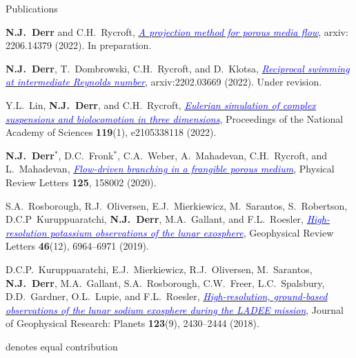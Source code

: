 \documentclass{cv}
\begin{document}
\begin{rSection}{Publications}

	\textbf{N.J.~Derr} and C.H.~Rycroft, \href{https://arxiv.org/abs/2206.14379}{\textcolor{blue}{\textit{A projection method for porous media flow}}}, arxiv: 2206.14379 (2022). In preparation.

	\textbf{N.J.~Derr}, T.~Dombrowski, C.H.~Rycroft, and D.~Klotsa, \href{https://arxiv.org/abs/2202.03669}{\textcolor{blue}{\textit{Reciprocal swimming at intermediate Reynolds number}}}, arxiv:2202.03669 (2022). Under revision.

	Y.L.~Lin, \textbf{N.J.~Derr}, and C.H.~Rycroft, \href{https://www.pnas.org/content/119/1/e2105338118}{\textcolor{blue}{\textit{Eulerian simulation of complex suspensions and biolocomotion in three dimensions}}}, Proceedings of the National Academy of Sciences \textbf{119}(1), e2105338118 (2022).

	\textbf{N.J.~Derr}$^*$, D.C.~Fronk$^*$, C.A.~Weber, A.~Mahadevan, C.H.~Rycroft, and L.~Mahadevan, \href{https://doi.org/10.1103/PhysRevLett.125.158002}{\textcolor{blue}{\textit{Flow-driven branching in a frangible porous medium}}}, Physical Review Letters \textbf{125}, 158002 (2020).

	S.A.~Rosborough, R.J.~Oliversen, E.J.~Mierkiewicz, M.~Sarantos, S.~Robertson, D.C.P~Kuruppuaratchi, \textbf{N.J.~Derr}, M.A.~Gallant, and F.L.~Roesler, \href{https://doi.org/10.1029/2019GL083022}{\textcolor{blue}{\textit{High-resolution potassium observations of the lunar exosphere}}}, Geophysical Review Letters \textbf{46}(12), 6964--6971 (2019). 

	D.C.P.~Kuruppuaratchi, E.J.~Mierkiewicz, R.J.~Oliversen, M.~Sarantos, \textbf{N.J.~Derr}, M.A.~Gallant, S.A.~Rosborough, C.W.~Freer, L.C.~Spalsbury, D.D.~Gardner, O.L.~Lupie, and F.L.~Roesler, \href{https://doi.org/10.1029/2018JE005717}{\textcolor{blue}{\textit{High-resolution, ground-based observations of the lunar sodium exosphere during the LADEE mission}}}, Journal of Geophysical Research: Planets \textbf{123}(9), 2430--2444 (2018).

	{\small * denotes equal contribution}
\end{rSection}
\end{document}
